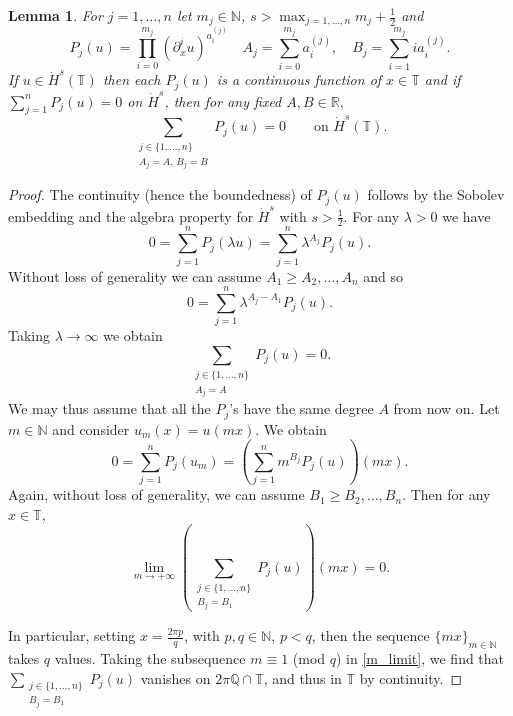 \documentclass[a4paper,10pt,reqno]{article}
\theoremstyle{definition}
\theoremstyle{plain}
\theoremstyle{plain}
\theoremstyle{definition}
\theoremstyle{plain}
\theoremstyle{plain}
\theoremstyle{plain}
\newtheorem{lemma}[definition]{Lemma}
\theoremstyle{definition}
\theoremstyle{definition}
\def \N{\mathbb N}
\def \Q{\mathbb Q}
\def \R{\mathbb R}
\def \pa{{\partial}}
\def \T{\mathbb{T}}
\begin{document}
\begin{lemma} \label{lemma: scaling}
For $j=1,\ldots,n$ let $m_j \in \N$, $s > \max_{j=1,\ldots,n} m_j + \frac{1}{2}$ and
\[
P_j(u) = \prod_{i=0}^{m_j} (\pa_x^i u)^{a_i^{(j)}} \quad A_j = \sum_{i=0}^{m_j} a_i^{(j)}, \quad B_j = \sum_{i=1}^{m_j} i a_i^{(j)}.
\]
If $u \in \dot{H}^s(\T)$ then each $P_j(u)$ is a continuous function of $x \in \T$ and if $\sum_{j=1}^n P_j(u) = 0$ on $\dot{H}^s$, then for any fixed $A,B \in \R,$
\[
\sum_{ \substack{ j \in \{ 1,\ldots,n \} \\ A_j = A, \, B_j = B } } P_j(u) = 0 \qquad \text{on $\dot{H}^s(\T).$}
\]
\end{lemma}
\begin{proof}
The continuity (hence the boundedness) of $P_j(u)$ follows by the Sobolev embedding and the algebra property for $\dot{H}^s$ with $s > \frac12$.
For any $\lambda > 0$ we have
\[
0 = \sum_{j=1}^n P_j(\lambda u) = \sum_{j=1}^n \lambda^{A_j} P_j(u).
\]
Without loss of generality we can assume $A_1 \ge A_2,\ldots,A_n$ and so
\[
0 = \sum_{j=1}^n \lambda^{A_j-A_1} P_j(u).
\]
Taking $\lambda \to \infty$ we obtain
\[
\sum_{ \substack{ j \in \{ 1,\ldots,n \} \\ A_j = A} } P_j(u) = 0.
\]
We may thus assume that all the $P_j$'s have the same degree $A$ from now on. Let $m \in \N$ and consider $u_m(x)=u(mx)$.
We obtain
\[
0 = \sum_{j=1}^n P_j(u_m) = \left ( \sum_{j=1}^n m^{B_j} P_j(u) \right )(mx).
\]
Again, without loss of generality, we can assume $B_1 \ge B_2,\ldots,B_n$. Then for any $x\in\T$,
\begin{equation}\label{m_limit}
\lim_{m \to +\infty} \left ( \sum_{ \substack{ j \in \{1,\ldots,n\} \\ B_j = B_1 } } P_j(u) \right ) \left (mx\right ) = 0.
\end{equation}

In particular, setting $x=\frac{2\pi p}{q}$, with $p,q\in\N$, $p<q$, then the sequence $\{mx\}_{m\in\N}$ takes $q$ values. 
Taking the subsequence $m\equiv 1$ (mod $q$) in \eqref{m_limit}, we find that $\sum_{ \substack{ j \in \{1,\ldots,n\} \\ B_j = B_1 } } P_j(u)$ vanishes on $2\pi\Q\cap \T$, and thus in $\T$ by continuity.
\end{proof}
\end{document}
